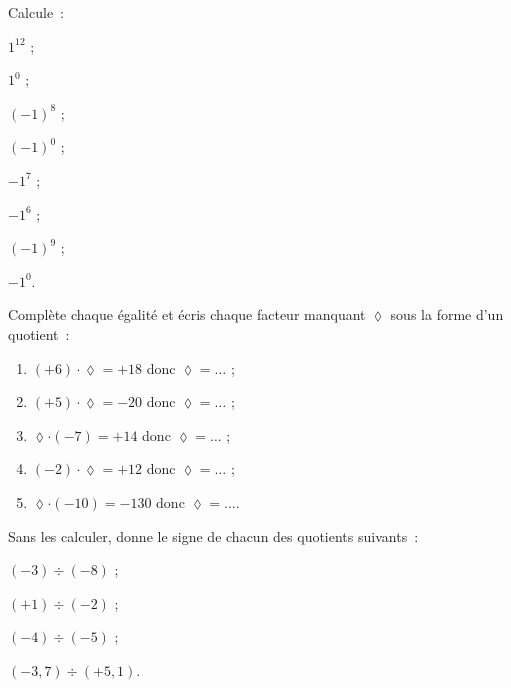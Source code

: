 \begin{exercice}[Puissance de 1 ou de $-1$]
Calcule :
\begin{colenumerate}{4}
 \item $1^{12}$ ;
 \item $1^{0}$ ;
 \item $(-1)^{8}$ ;
 \item $(-1)^{0}$ ;
 \item $-1^{7}$ ;
 \item $-1^{6}$ ;
 \item $(-1)^{9}$ ;
 \item $-1^{0}$.
 \end{colenumerate}
\end{exercice}



\begin{exercice}
Complète chaque égalité et écris chaque facteur manquant $\lozenge$ sous la forme d'un quotient :
\begin{enumerate}
 \item $(+6) \cdot \lozenge = +18$ donc $\lozenge = \ldots$ ;
 \item $(+5) \cdot \lozenge = -20$ donc $\lozenge = \ldots$ ;
 \item $\lozenge \cdot (-7) = +14$ donc  $\lozenge = \ldots$ ;
 \item $(-2) \cdot \lozenge = +12$ donc  $\lozenge = \ldots$ ;
 \item $\lozenge \cdot (-10) = -130$ donc  $\lozenge = \ldots$.
 \end{enumerate}
\end{exercice}


\begin{exercice}
Sans les calculer, donne le signe de chacun des quotients suivants :
\begin{colenumerate}{2}
 \item $(-3) \div (-8)$ ;
 \item $(+1) \div (-2)$ ;
 \item $(-4) \div (-5)$ ;
 \item $(-3,7) \div (+5,1)$.
 \end{colenumerate}
\end{exercice}


